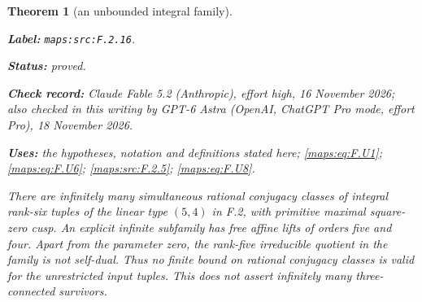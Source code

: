 \documentclass[11pt,a4paper]{article}
\newtheorem{theorem}{Theorem}[section]
\theoremstyle{definition}
\newcommand{\StatementRecord}[4]{\par\smallskip\begingroup\upshape\raggedright\noindent\textbf{Label:} \nolinkurl{#1}.\par\noindent\textbf{Status:} #2.\par\noindent\textbf{Check record:} #3.\par\noindent\textbf{Uses:} #4.\par\endgroup\smallskip}
\newcommand{\CurrentChecker}{GPT-6 Astra (OpenAI, ChatGPT Pro mode, effort Pro), 18 November 2026}
\begin{document}
\begin{theorem}[an unbounded integral family]\label{maps:src:F.2.16}
\StatementRecord{maps:src:F.2.16}{proved}{Claude Fable 5.2 (Anthropic), effort high, 16 November 2026; also checked in this writing by \CurrentChecker}{the hypotheses, notation and definitions stated here; \cref{maps:eq:F.U1}; \cref{maps:eq:F.U6}; \cref{maps:src:F.2.5}; \cref{maps:eq:F.U8}}


There are infinitely many simultaneous rational conjugacy classes
of integral rank-six tuples of the linear type $(5,4)$ in F.2,
with primitive maximal square-zero cusp.  An explicit infinite
subfamily has free affine lifts of orders five and four.
Apart from the parameter zero, the rank-five irreducible quotient
in the family is not self-dual.  Thus no finite bound on rational
conjugacy classes is valid for the unrestricted input tuples.
This does not assert infinitely many three-connected survivors.

\end{theorem}
\end{document}
